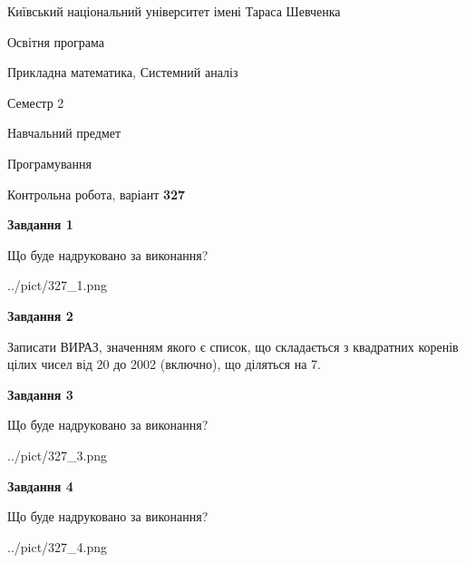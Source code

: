 \documentclass[12pt, ukrainian]{article}
\begin{document}
{{\begin {small}\par
{ \center  Київський національний університет імені Тараса Шевченка \par}
{\parbox {5 cm}{Освітня програма \hfill}{\parbox {8 cm}{Прикладна математика, Системний аналіз \hfill}}\parbox {5 cm}{\hfill Семестр 2}}\par
{\parbox {5 cm} {Навчальний предмет \hfill}\parbox {7 cm}{Програмування \hfill}\parbox {6cm}{\hfill}\par}\vspace{-7pt} \end{small}}{\center Контрольна робота, варіант  \No \textbf
{ 327 }\par}}
{
\begin {large}
{\begin {center}\textbf{Завдання 1}\end {center}}\par
Що буде надруковано за виконання?\par\par
\begin{center}
	{../pict/327_1.png}
\end{center}
\newpage

{\begin {center}\textbf{Завдання 2}\end {center}}\par

Записати ВИРАЗ, значенням якого є список, що складається з квадратних коренів цілих чисел від 20 до 2002 (включно), що діляться на 7.\par
\newpage

{\begin {center}\textbf{Завдання 3}\end {center}}\par
Що буде надруковано за виконання?\par
\begin{center}
	{../pict/327_3.png}
\end{center}
\newpage

{\begin {center}\textbf{Завдання 4}\end {center}}\par
Що буде надруковано за виконання?\par
\begin{center}
	{../pict/327_4.png}
\end{center}
\newpage


\end{large}}
\end{document}
